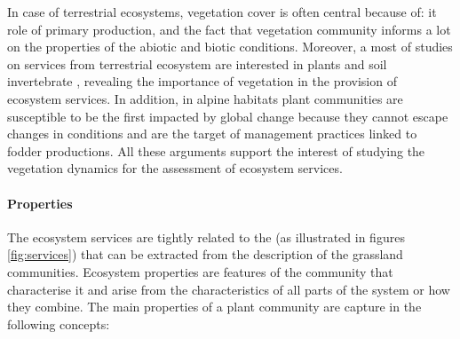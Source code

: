 In case of terrestrial ecosystems, vegetation cover is often central because of: it role of primary production, and the fact that vegetation community informs a lot on the properties of the abiotic and biotic conditions. Moreover, a most of studies on services from terrestrial ecosystem are interested in plants and soil invertebrate \cite{de_bello_towards_2010}, revealing the importance of vegetation in the provision of ecosystem services. In addition, in alpine habitats plant communities are susceptible to be the first impacted by global change because they cannot escape changes in conditions and are the target of management practices linked to fodder productions. All these arguments support the interest of studying the vegetation dynamics for the assessment of ecosystem services.


\paragraph{Properties}
The ecosystem services are tightly related to the  (as illustrated in figures \ref{fig:services})\parencite{lavorel_predicting_2002, diaz_incorporating_2007} that can be extracted from the description of the grassland communities. Ecosystem properties are features of the community that characterise it and arise from the characteristics of all parts of  the system or how they combine. The main properties of a plant community are capture in the following concepts:
